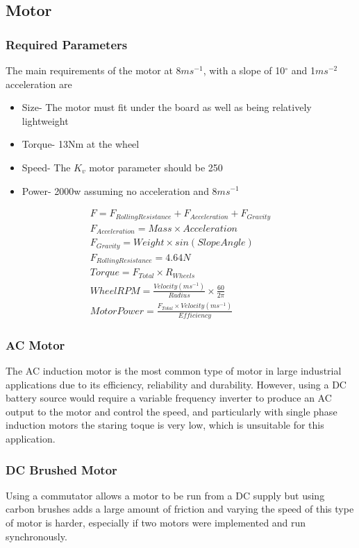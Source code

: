 \documentclass[journal,10pt]{IEEEtran}
\begin{document}
    \subsection{Motor}
        \subsubsection{Required Parameters}
        The main requirements of the motor at 8$ms^{-1}$, with a slope of 10$^{\circ}$ and 1$ms^{-2}$ acceleration are
        \begin{itemize}
        	\item Size- The motor must fit under the board as well as being relatively lightweight
        	\item Torque- 13Nm at the wheel 
        	\item Speed- The $K_{v}$ motor parameter should be 250
        	\item Power- 2000w assuming no acceleration and 8$ms^{-1}$
        \end{itemize}
        \begin{gather*}
            F = F_{Rolling Resistance} + F_{Acceleration} + F_{Gravity}
            \\F_{Acceleration} = Mass \times Acceleration
            \\F_{Gravity} = Weight \times sin(Slope Angle)
            \\F_{Rolling Resistance} = 4.64N
            \\Torque = F_{Total} \times R_{Wheels}
            \\Wheel RPM = \frac{Velocity (ms^{-1})}{Radius}\times \frac{60}{2\pi}
            \\Motor Power = \frac{F_{Total} \times Velocity (ms^{-1})}{Efficiency}
        \end{gather*}
        \subsubsection{AC Motor}
            The AC induction motor is the most common type of motor in large industrial applications due to its efficiency, reliability and durability. However, using a DC battery source would require a variable frequency inverter to produce an AC output to the motor and control the speed, and particularly with single phase induction motors the staring toque is very low, which is unsuitable for this application. 
        \subsubsection{DC Brushed Motor}
            Using a commutator allows a motor to be run from a DC supply but using carbon brushes adds a large amount of friction and varying the speed of this type of motor is harder, especially if two motors were implemented and run synchronously.
\end{document}
